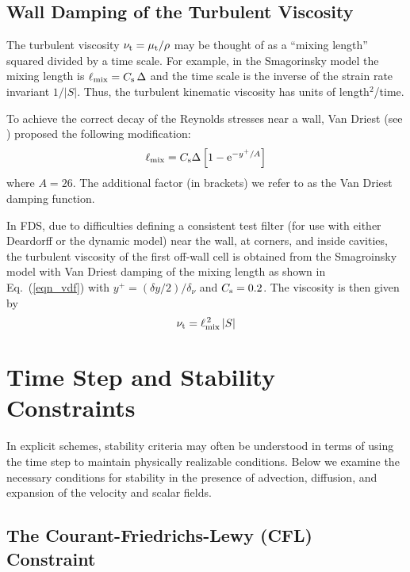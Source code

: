 \subsection{Wall Damping of the Turbulent Viscosity}
\label{sec:wall_damping}

The turbulent viscosity $\nu_{\rm t} = \mu_{\rm t}/\rho$ may be thought of as a ``mixing length'' squared divided by a time scale.  For example, in the Smagorinsky model the mixing length is $\ell_{\rm mix} = C_{\rm s} \,\Delta$ and the time scale is the inverse of the strain rate invariant $1/|S|$.  Thus, the turbulent kinematic viscosity has units of length$^2$/time.

To achieve the correct decay of the Reynolds stresses near a wall, Van Driest (see \cite{Wilcox:1}) proposed the following modification:
\begin{equation}
\label{eqn_vdf}
\ell_{\rm mix} = C_{\rm s} \Delta \left[ 1 - \mathrm{e}^{-y^+/A} \right]
\end{equation}
where $A=26$.  The additional factor (in brackets) we refer to as the Van Driest damping function.

In FDS, due to difficulties defining a consistent test filter (for use with either Deardorff or the dynamic model) near the wall, at corners, and inside cavities, the turbulent viscosity of the first off-wall cell is obtained from the Smagroinsky model with Van Driest damping of the mixing length as shown in Eq.~(\ref{eqn_vdf}) with $y^+ = (\delta y/2)/\delta_\nu$ and $C_{\rm s} = 0.2$.  The viscosity is then given by\begin{equation}
\label{eqn_nearwall_viscosity}
\nu_{\rm t} = \ell_{\rm mix}^{\,2}\,|S|
\end{equation}

\newpage
\section{Time Step and Stability Constraints}
\label{stability}

In explicit schemes, stability criteria may often be understood in terms of using the time step to maintain physically realizable conditions.  Below we examine the necessary conditions for stability in the presence of advection, diffusion, and expansion of the velocity and scalar fields.

\subsection{The Courant-Friedrichs-Lewy (CFL) Constraint}

